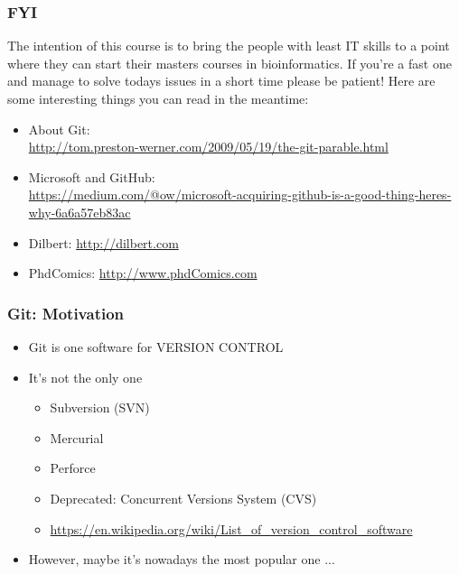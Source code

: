 \documentclass{beamer} %
\begin{document}
\begin{frame}
\frametitle{FYI}

The intention of this course is to bring the people with least IT skills to a point where
they can start their masters courses in bioinformatics. If you're a fast one and manage to
solve todays issues in a short time please be patient! Here are some interesting things you
can read in the meantime:

\begin{itemize}
    \setlength\itemsep{1em}
	\item About Git: \\ \url{http://tom.preston-werner.com/2009/05/19/the-git-parable.html}
	\item Microsoft and GitHub: \\ \url{https://medium.com/@ow/microsoft-acquiring-github-is-a-good-thing-heres-why-6a6a57eb83ac}
    \item Dilbert: \url{http://dilbert.com}
    \item PhdComics: \url{http://www.phdComics.com}
\end{itemize}
\end{frame}

\begin{frame}[t]
\frametitle{Git: Motivation}
\begin{itemize}
    \setlength\itemsep{1em}
	\item Git is one software for VERSION CONTROL \newline
    \item It's not the only one
    
	\begin{itemize}
    	\setlength\itemsep{0.4em}
		\item Subversion (SVN)
        \item Mercurial
        \item Perforce 
        \item Deprecated: Concurrent Versions System (CVS)
        \item \href{https://en.wikipedia.org/wiki/List_of_version_control_software}{https://en.wikipedia.org/wiki/List\_of\_version\_control\_software} 
	\end{itemize}
    
    \item However, maybe it's nowadays the most popular one ...
    
\end{itemize}
\end{frame}
\end{document}
